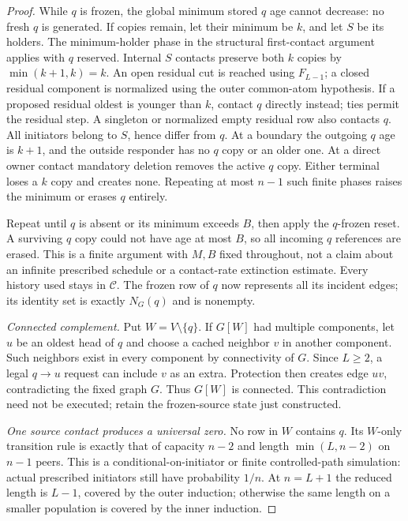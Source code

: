 \documentclass[11pt]{article}
\begin{document}
\begin{proof}
While $q$ is frozen, the global minimum stored $q$ age cannot
decrease: no fresh $q$ is generated. If copies remain, let their
minimum be $k$, and let $S$ be its holders. The minimum-holder
phase in the structural first-contact argument applies with
$q$ reserved. Internal $S$ contacts preserve both $k$ copies by
$\min(k+1,k)=k$. An open residual cut is reached using $F_{L-1}$;
a closed residual component is normalized using the outer
common-atom hypothesis. If a proposed residual oldest is younger
than $k$, contact $q$ directly instead; ties permit the residual
step. A singleton or normalized empty residual row also contacts
$q$. All initiators belong to $S$, hence differ from $q$.
At a boundary the outgoing $q$ age is $k+1$, and the outside
responder has no $q$ copy or an older one. At a direct owner
contact mandatory deletion removes the active $q$ copy.
Either terminal loses a $k$ copy and creates none. Repeating
at most $n-1$ such finite phases raises the minimum or erases
$q$ entirely.

Repeat until $q$ is absent or its minimum exceeds $B$, then
apply the $q$-frozen reset. A surviving $q$ copy could not have
age at most $B$, so all incoming $q$ references are erased.
This is a finite argument with $M,B$ fixed throughout, not a
claim about an infinite prescribed schedule or a contact-rate
extinction estimate. Every history used stays in $\mathcal C$.
The frozen row of $q$ now represents all its incident edges;
its identity set is exactly $N_G(q)$ and is nonempty.

\emph{Connected complement.}
Put $W=V\setminus\{q\}$. If $G[W]$ had multiple components,
let $u$ be an oldest head of $q$ and choose a cached neighbor
$v$ in another component. Such neighbors exist in every
component by connectivity of $G$. Since $L\ge2$, a legal
$q\to u$ request can include $v$ as an extra. Protection then
creates edge $uv$, contradicting the fixed graph $G$.
Thus $G[W]$ is connected. This contradiction need not be executed;
retain the frozen-source state just constructed.

\emph{One source contact produces a universal zero.}
No row in $W$ contains $q$. Its $W$-only transition rule is exactly
that of capacity $n-2$ and length $\min(L,n-2)$ on $n-1$ peers.
This is a conditional-on-initiator or finite controlled-path
simulation: actual prescribed initiators still have probability
$1/n$. At $n=L+1$ the reduced length is $L-1$, covered by the
outer induction; otherwise the same length on a smaller population
is covered by the inner induction.


\end{proof}
\end{document}
